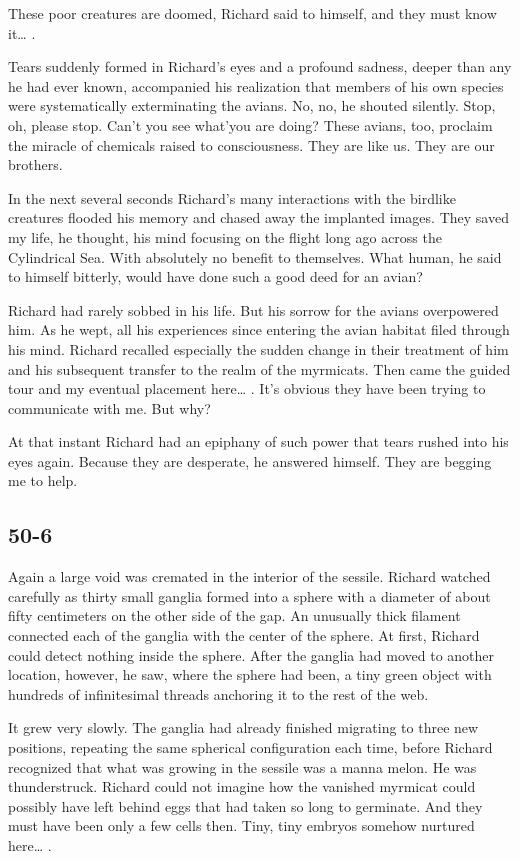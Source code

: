 \documentclass[]{article}
\begin{document}
{{These poor creatures are doomed, Richard said to himself, and they must know it… .

Tears suddenly formed in Richard’s eyes and a profound sadness, deeper than any he had ever known, accompanied his realization that members of his own species were systematically exterminating the avians.  No, no, he shouted silently.  Stop, oh, please stop.  Can’t you see what’you are doing? These avians, too, proclaim the miracle of chemicals raised to consciousness.  They are like us.  They are our brothers.

In the next several seconds Richard’s many interactions with the birdlike creatures flooded his memory and chased away the implanted images.  They saved my life, he thought, his mind focusing on the flight long ago across the Cylindrical Sea.  With absolutely no benefit to themselves.  What human, he said to himself bitterly, would have done such a good deed for an avian?

Richard had rarely sobbed in his life.  But his sorrow for the avians overpowered him.  As he wept, all his experiences since entering the avian habitat filed through his mind.  Richard recalled especially the sudden change in their treatment of him and his subsequent transfer to the realm of the myrmicats.  Then came the guided tour and my eventual placement here… .  It’s obvious they have been trying to communicate with me.  But why?

At that instant Richard had an epiphany of such power that tears rushed into his eyes again.  Because they are desperate, he answered himself.  They are begging me to help.



\subsection*{50-6}

Again a large void was cremated in the interior of the sessile.  Richard watched carefully as thirty small ganglia formed into a sphere with a diameter of about fifty centimeters on the other side of the gap.  An unusually thick filament connected each of the ganglia with the center of the sphere.  At first, Richard could detect nothing inside the sphere.  After the ganglia had moved to another location, however, he saw, where the sphere had been, a tiny green object with hundreds of infinitesimal threads anchoring it to the rest of the web.

It grew very slowly.  The ganglia had already finished migrating to three new positions, repeating the same spherical configuration each time, before Richard recognized that what was growing in the sessile was a manna melon.  He was thunderstruck.  Richard could not imagine how the vanished myrmicat could possibly have left behind eggs that had taken so long to germinate.  And they must have been only a few cells then.  Tiny, tiny embryos somehow nurtured here… .

}}
\end{document}
